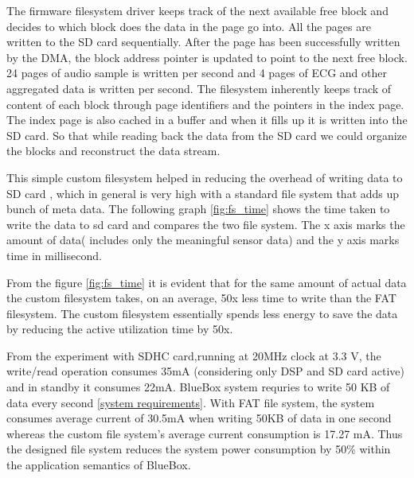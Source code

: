 The firmware filesystem driver keeps track of the next available free block and decides to which block does the data in the page go into. All the pages are written to the SD card sequentially. After the page has been successfully written by the DMA, the block address pointer is updated to point to the next free block.  24 pages of audio sample is written per second and 4 pages of ECG and other aggregated data is written per second.  
The filesystem inherently keeps track of content of each block through page identifiers and the pointers in the index page. The index page is also cached in a buffer and when it fills up it is written into the SD card. So that while reading back the data from the SD card we could organize the blocks and reconstruct the data stream.  

This simple custom filesystem  helped in reducing the overhead of writing data to SD card , which in general is very high with a standard file system that adds up bunch of meta data. The following graph \ref{fig:fs_time} shows the time taken to write the data to sd card and compares the two file system. The x axis marks the amount of data( includes only the meaningful sensor data)  and the y axis marks time in millisecond.

\label{fig:fs_time}

From the figure \ref{fig:fs_time} it is evident that for the same amount of actual data the custom filesystem takes, on an average, 50x less time to write than the FAT filesystem. The custom filesystem essentially spends less energy to save the data by reducing the active utilization time by 50x. 


From the experiment with SDHC card,running at 20MHz clock at 3.3 V,  the write/read operation consumes 35mA (considering only DSP and SD card active) and in standby it consumes 22mA. BlueBox system requries to write 50 KB of data every second \ref{system requirements}. With FAT file system, the system consumes average current of 30.5mA when writing 50KB of data in one second whereas the custom file system's average current consumption is 17.27 mA. Thus the designed file system reduces the system power consumption by 50\% within the application semantics of BlueBox. 